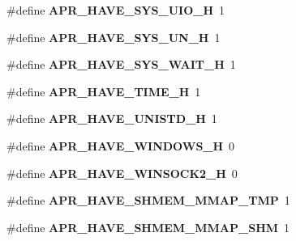 \begin{DoxyCompactItemize}
\item 
\#define {\bfseries A\+P\+R\+\_\+\+H\+A\+V\+E\+\_\+\+S\+Y\+S\+\_\+\+U\+I\+O\+\_\+H}~1\hypertarget{group__apr__platform_gabaeaf82b82e76979dfbe64a43e02b23f}{}\label{group__apr__platform_gabaeaf82b82e76979dfbe64a43e02b23f}

\item 
\#define {\bfseries A\+P\+R\+\_\+\+H\+A\+V\+E\+\_\+\+S\+Y\+S\+\_\+\+U\+N\+\_\+H}~1\hypertarget{group__apr__platform_ga342802d31427d75aa8d9508fc42862f1}{}\label{group__apr__platform_ga342802d31427d75aa8d9508fc42862f1}

\item 
\#define {\bfseries A\+P\+R\+\_\+\+H\+A\+V\+E\+\_\+\+S\+Y\+S\+\_\+\+W\+A\+I\+T\+\_\+H}~1\hypertarget{group__apr__platform_ga4358584279b9bef5e9befef3e70be3a0}{}\label{group__apr__platform_ga4358584279b9bef5e9befef3e70be3a0}

\item 
\#define {\bfseries A\+P\+R\+\_\+\+H\+A\+V\+E\+\_\+\+T\+I\+M\+E\+\_\+H}~1\hypertarget{group__apr__platform_gad8de7d46efa8bf6404fcb105cb9fec66}{}\label{group__apr__platform_gad8de7d46efa8bf6404fcb105cb9fec66}

\item 
\#define {\bfseries A\+P\+R\+\_\+\+H\+A\+V\+E\+\_\+\+U\+N\+I\+S\+T\+D\+\_\+H}~1\hypertarget{group__apr__platform_ga5027a53811b56363639e832027752456}{}\label{group__apr__platform_ga5027a53811b56363639e832027752456}

\item 
\#define {\bfseries A\+P\+R\+\_\+\+H\+A\+V\+E\+\_\+\+W\+I\+N\+D\+O\+W\+S\+\_\+H}~0\hypertarget{group__apr__platform_ga129087a39c180d855be6585c9efe2ff2}{}\label{group__apr__platform_ga129087a39c180d855be6585c9efe2ff2}

\item 
\#define {\bfseries A\+P\+R\+\_\+\+H\+A\+V\+E\+\_\+\+W\+I\+N\+S\+O\+C\+K2\+\_\+H}~0\hypertarget{group__apr__platform_ga46a930f2ecfa34bfa627a8f18532bceb}{}\label{group__apr__platform_ga46a930f2ecfa34bfa627a8f18532bceb}

\item 
\#define {\bfseries A\+P\+R\+\_\+\+H\+A\+V\+E\+\_\+\+S\+H\+M\+E\+M\+\_\+\+M\+M\+A\+P\+\_\+\+T\+MP}~1\hypertarget{group__apr__platform_gaac072bb1db885925d1d426a1650aee18}{}\label{group__apr__platform_gaac072bb1db885925d1d426a1650aee18}

\item 
\#define {\bfseries A\+P\+R\+\_\+\+H\+A\+V\+E\+\_\+\+S\+H\+M\+E\+M\+\_\+\+M\+M\+A\+P\+\_\+\+S\+HM}~1\hypertarget{group__apr__platform_gaae95d5ab380a1519c849b3f54f53dbdb}{}\label{group__apr__platform_gaae95d5ab380a1519c849b3f54f53dbdb}


\end{DoxyCompactItemize}
